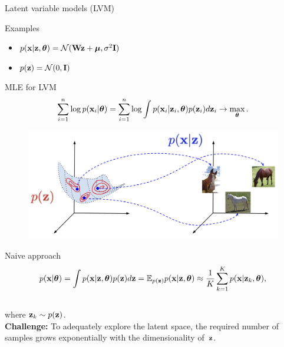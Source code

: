\documentclass{beamer}
\begin{document}
\begin{frame}{Latent variable models (LVM)}
\begin{block}{Examples}
\begin{minipage}[t]{0.53\columnwidth}
\begin{figure}
			\end{figure}
			\vspace{-0.3cm}
			\begin{itemize}
				\item $p(\mathbf{x} | \mathbf{z}, \boldsymbol{\theta}) = \mathcal{N}(\mathbf{W} \mathbf{z} + \boldsymbol{\mu}, \sigma^2 \mathbf{I})$
				\item $p(\mathbf{z}) = \mathcal{N}(0, \mathbf{I})$
			\end{itemize}
		\end{minipage}
	\end{block}
\end{frame}
\begin{frame}{MLE for LVM}
	\vspace{-0.3cm}
	\[
		\sum_{i=1}^n \log p(\mathbf{x}_i | \boldsymbol{\theta}) = \sum_{i=1}^n \log \int p(\mathbf{x}_i| \mathbf{z}_i, \boldsymbol{\theta}) p(\mathbf{z}_i) d\mathbf{z}_i \rightarrow \max_{\boldsymbol{\theta}}.
	\]
	\vspace{-0.5cm}
	\begin{figure}
		\includegraphics[width=.65\linewidth]{figs/lvm_diagram}
	\end{figure}
	\vspace{-0.3cm}
	\begin{block}{Naive approach}
		\vspace{-0.7cm}
		\[
			p(\mathbf{x} | \boldsymbol{\theta}) = \int p(\mathbf{x} | \mathbf{z}, \boldsymbol{\theta}) p(\mathbf{z}) d\mathbf{z} = \mathbb{E}_{p(\mathbf{z})} p(\mathbf{x} | \mathbf{z}, \boldsymbol{\theta}) \approx \frac{1}{K} \sum_{k=1}^{K} p(\mathbf{x} | \mathbf{z}_k, \boldsymbol{\theta}),
		\]
		\vspace{-0.5cm} \\
		where $\mathbf{z}_k \sim p(\mathbf{z})$. \\
		\textbf{Challenge:} To adequately explore the latent space, the required number of samples grows exponentially with the dimensionality of~$\mathbf{z}$. 
	\end{block}
\end{frame}
\end{document}
